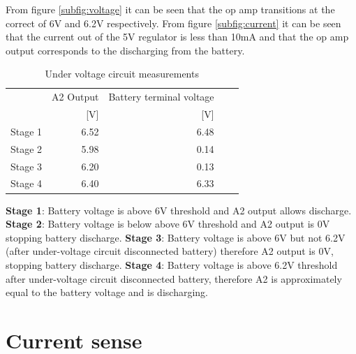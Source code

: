 From figure \ref{subfig:voltage} it can be seen that the op amp transitions at the correct of 6V and 6.2V respectively. From figure \ref{subfig:current} it can be seen that the current out of the 5V regulator is less than 10mA and that the op amp output corresponds to the discharging from the battery. 



\begin{table}[!htb]
	\centering
	\footnotesize
	\caption{Under voltage circuit measurements}
	\begin{tabular}{lrrrr}
		\toprule
		& A2 Output& Battery terminal voltage \\
		&  [V]&[V] \\
		\midrule
		Stage 1 & 6.52 &6.48    \\
		Stage 2 &  5.98&0.14     \\
		Stage 3 &  6.20&0.13     \\
		Stage 4 &  6.40&6.33     \\
		
		\bottomrule
	\end{tabular}
	\label{tab:stagemeas}
\end{table}

\begin{flushleft}
\textbf{Stage 1}: Battery voltage is above 6V threshold and A2 output allows discharge.\newline
\textbf{Stage 2}: Battery voltage is below above 6V threshold and A2 output is 0V stopping battery discharge.\newline
\textbf{Stage 3}: Battery voltage is above 6V but not 6.2V (after under-voltage circuit disconnected battery) therefore A2 output is 0V, stopping battery discharge.\newline
\textbf{Stage 4}: Battery voltage is above 6.2V threshold after under-voltage circuit disconnected battery, therefore A2 is approximately equal to the battery voltage and is discharging.\newline
\end{flushleft}






\newpage
\section{Current sense}


